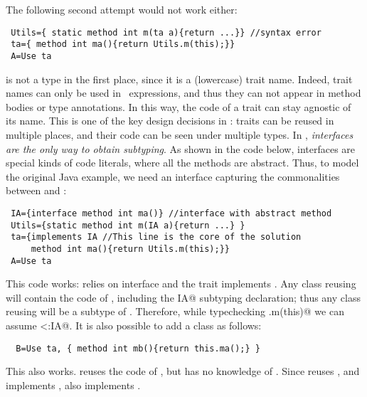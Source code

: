The following second attempt would not work either:
\saveSpace\saveSpace
\begin{lstlisting}
 Utils={ static method int m(ta a){return ...}} //syntax error
 ta={ method int ma(){return Utils.m(this);}}
 A=Use ta
\end{lstlisting}
\saveSpace\saveSpace
\Q@ta@ is not a type in the first place, since it is a (lowercase) trait name.
Indeed, trait names can only be used in \use\ expressions, and thus they can not appear in method bodies or type annotations.
In this way, the code of a trait can stay agnostic of its name. This is one of the key design decisions in \name:
traits can be reused in multiple places, and their code can be seen under multiple types.
In \name, \emph{interfaces are the only way to obtain subtyping}. As shown in the code below, interfaces are special kinds of code literals, where all the methods are abstract.
Thus, to model the original Java example, we need an interface
capturing the commonalities between \Q@A@ and \Q@B@:
\saveSpace\saveSpace
\begin{lstlisting}
 IA={interface method int ma()} //interface with abstract method
 Utils={static method int m(IA a){return ...} }
 ta={implements IA //This line is the core of the solution
     method int ma(){return Utils.m(this);}}
 A=Use ta
\end{lstlisting}
\saveSpace\saveSpace
This code works: \Q@Utils@ relies on interface \Q@IA@ and the trait \Q@ta@
implements \Q@IA@.
Any class reusing \Q@ta@ will contain the code of \Q@ta@,
including the \Q@implements IA@ subtyping declaration; thus any class reusing \Q@ta@ will be a subtype of \Q@IA@. 
Therefore, while typechecking \Q@Utils.m(this)@ we can assume
\Q@this<:IA@.
 It is also possible to add a class \Q@B@ as follows:
\saveSpace\saveSpace
\begin{lstlisting}
  B=Use ta, { method int mb(){return this.ma();} }
\end{lstlisting}
\saveSpace\saveSpace
This also works.  \Q@B@ reuses the code of \Q@ta@, but has no knowledge of \Q@A@.
Since \Q@B@ reuses \Q@ta@, and \Q@ta@ implements \Q@IA@, \Q@B@ also implements \Q@IA@. 

